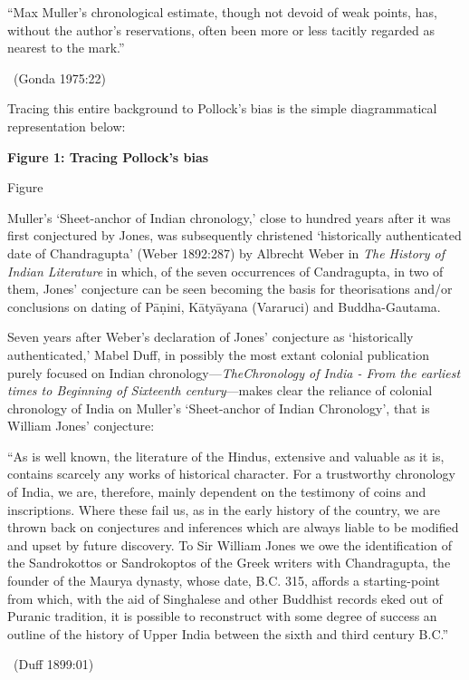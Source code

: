 \begin{myquote}
“Max Muller’s chronological estimate, though not devoid of weak points, has, without the author’s reservations, often been more or less tacitly regarded as nearest to the mark.” 

~\hfill (Gonda 1975:22)
\end{myquote}

Tracing this entire background to Pollock’s bias is the simple diagrammatical representation below:

\textbf{Figure 1: Tracing Pollock’s bias}

\begin{center}
Figure
\end{center}

Muller’s ‘Sheet-anchor of Indian chronology,’ close to hundred years after it was first conjectured by Jones, was subsequently christened ‘historically authenticated date of Chandragupta’ (Weber 1892:287) by Albrecht Weber in \textit{The History of Indian Literature} in which, of the seven occurrences of Candragupta, in two of them, Jones’ conjecture can be seen becoming the basis for theorisations and/or conclusions on dating of Pāṇini, Kātyāyana (Vararuci) and Buddha-Gautama.

Seven years after Weber’s declaration of Jones’ conjecture as ‘historically authenticated,’ Mabel Duff, in possibly the most extant colonial publication purely focused on Indian chronology—\textit{The}\textit{Chronology of India - From the earliest times to Beginning of Sixteenth century}—makes clear the reliance of colonial chronology of India on Muller’s ‘Sheet-anchor of Indian Chronology’, that is William Jones’ conjecture:

\begin{myquote}
“As is well known, the literature of the Hindus, extensive and valuable as it is, contains scarcely any works of historical character. For a trustworthy chronology of India, we are, therefore, mainly dependent on the testimony of coins and inscriptions. Where these fail us, as in the early history of the country, we are thrown back on conjectures and inferences which are always liable to be modified and upset by future discovery. To Sir William Jones we owe the identification of the Sandrokottos or Sandrokoptos of the Greek writers with Chandragupta, the founder of the Maurya dynasty, whose date, B.C. 315, affords a starting-point from which, with the aid of Singhalese and other Buddhist records eked out of Puranic tradition, it is possible to reconstruct with some degree of success an outline of the history of Upper India between the sixth and third century B.C.” 

~\hfill (Duff 1899:01)
\end{myquote}

